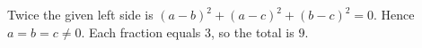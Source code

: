 Twice the given left side is $(a-b)^2+(a-c)^2+(b-c)^2=0$. Hence $a=b=c\ne0$. Each fraction equals $3$, so the total is $\boxed9$.
